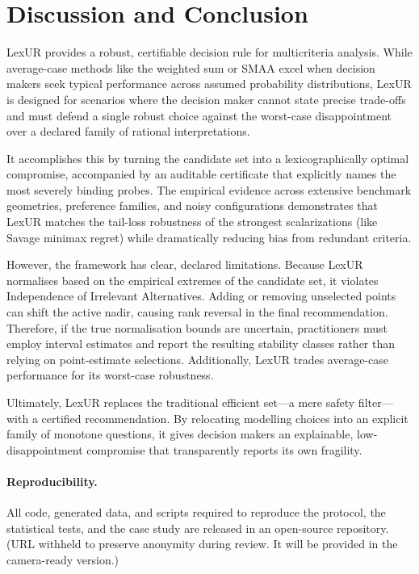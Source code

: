 \section{Discussion and Conclusion}
\label{sec:disc}
\label{sec:conc}

LexUR provides a robust, certifiable decision rule for multicriteria analysis. While average-case methods like the weighted sum or SMAA excel when decision makers seek typical performance across assumed probability distributions, LexUR is designed for scenarios where the decision maker cannot state precise trade-offs and must defend a single robust choice against the worst-case disappointment over a declared family of rational interpretations. 

It accomplishes this by turning the candidate set into a lexicographically optimal compromise, accompanied by an auditable certificate that explicitly names the most severely binding probes. The empirical evidence across extensive benchmark geometries, preference families, and noisy configurations demonstrates that LexUR matches the tail-loss robustness of the strongest scalarizations (like Savage minimax regret) while dramatically reducing bias from redundant criteria.

However, the framework has clear, declared limitations. Because LexUR normalises based on the empirical extremes of the candidate set, it violates Independence of Irrelevant Alternatives. Adding or removing unselected points can shift the active nadir, causing rank reversal in the final recommendation. Therefore, if the true normalisation bounds are uncertain, practitioners must employ interval estimates and report the resulting stability classes rather than relying on point-estimate selections. Additionally, LexUR trades average-case performance for its worst-case robustness.

Ultimately, LexUR replaces the traditional efficient set—a mere safety filter—with a certified recommendation. By relocating modelling choices into an explicit family of monotone questions, it gives decision makers an explainable, low-disappointment compromise that transparently reports its own fragility.

\paragraph{Reproducibility.}
All code, generated data, and scripts required to reproduce the protocol, the statistical tests, and the case study are released in an open-source repository. (URL withheld to preserve anonymity during review. It will be provided in the camera-ready version.)
